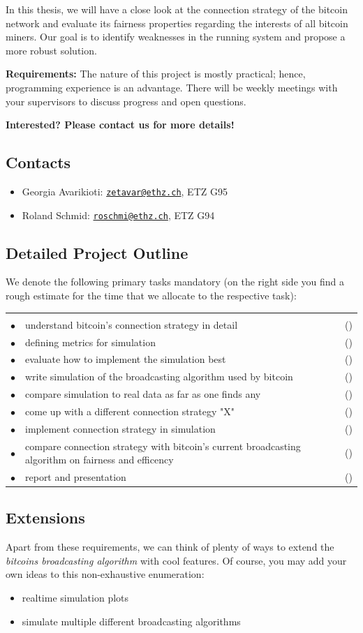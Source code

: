 \documentclass[a4paper,11pt]{article}
\newenvironment{reqlist}{\par \medskip \noindent \begin{tabular}{cp{0.83\textwidth}r} \\[-24pt]}{\end{tabular}}
\newcommand\req{\\ \smallskip \smallskip \hspace{0.24cm} $\bullet$\hspace{-0.2cm} & }
\newcounter{num}
\newcommand\effort[1]{\mbox{(\forloop{num}{0}{\value{num} < #1}{$\star$})}}
\begin{document}
\noindent In this thesis, we will have a close look at the connection strategy of the bitcoin network and evaluate its fairness properties regarding the interests of all bitcoin miners. Our goal is to identify weaknesses in the running system and propose a more robust solution.
\bigskip

\noindent \textbf{Requirements:} The nature of this project is mostly practical; hence, programming experience is an advantage. There will be weekly meetings with your supervisors to discuss progress and open questions.
\bigskip

\noindent \textbf{Interested? Please contact us for more details!}

\subsection*{Contacts}
\begin{itemize}
	\item Georgia Avarikioti: \href{mailto:Georgia Avarikioti <zetavar@ethz.ch>}{\texttt{zetavar@ethz.ch}}, ETZ G95
	\item Roland Schmid: \href{mailto:Roland Schmid <roschmi@ethz.ch>}{\texttt{roschmi@ethz.ch}}, ETZ G94
\end{itemize}

\newpage

\subsection*{Detailed Project Outline}
We denote the following primary tasks mandatory (on the right side you find a rough estimate for the time that we allocate to the respective task):
\begin{reqlist}
	\req understand bitcoin's connection strategy in detail & \effort{2}
	\req defining metrics for simulation & \effort{2}
	\req evaluate how to implement the simulation best & \effort{1}
	\req write simulation of the broadcasting algorithm used by bitcoin & \effort{4}
	\req compare simulation to real data as far as one finds any & \effort{3}
	\req come up with a different connection strategy "X" & \effort{4}
	\req implement connection strategy in simulation & \effort{2}
	\req compare connection strategy with bitcoin's current broadcasting algorithm on fairness and efficency & \effort{2}
	\req report and presentation & \effort{2}
\end{reqlist}

\subsection*{Extensions}
\noindent Apart from these requirements, we can think of plenty of ways to extend the \textit{bitcoins broadcasting algorithm} with cool features. Of course, you may add your own ideas to this non-exhaustive enumeration:
\begin{itemize}
	\item realtime simulation plots
	\item simulate multiple different broadcasting algorithms
\end{itemize}
\end{document}
